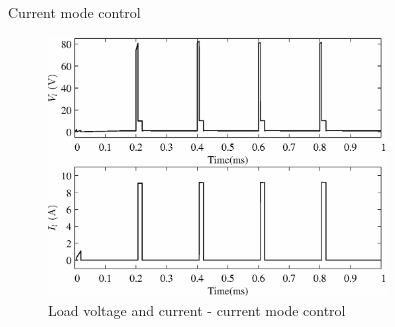 \documentclass[10pt]{beamer}
\begin{document}
\begin{frame}{Current mode control}
  \begin{figure}
  \centering
  \includegraphics[width=0.8\textwidth]{load_cmc}
  \caption{Load voltage and current - current mode control}
  \label{fig:sim-cmc}
  \end{figure}
\end{frame}
\end{document}

